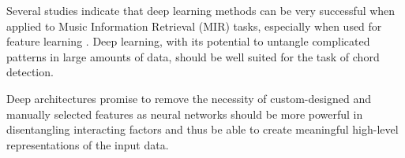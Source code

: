 \documentclass[landscape,archE1,fontscale=0.315]{baposter} %
\newcommand{\compresslist}{ %
\setlength{\itemsep}{1pt}
\setlength{\parskip}{0pt}
\setlength{\parsep}{0pt}
}
\begin{document}
\begin{poster}
{Several studies indicate that deep learning methods can be very successful
when applied to Music Information Retrieval (MIR)
tasks, especially when used for feature learning \cite{hamel2010learning}.
Deep learning, with its potential to untangle complicated
patterns in large amounts of data, should be well suited for
the task of chord detection.

Deep architectures
promise to remove the necessity of custom-designed
and manually selected features as neural networks should
be more powerful in disentangling interacting factors and
thus be able to create meaningful high-level representations
of the input data.

\vspace{0.3em} %
}


\end{poster}
\end{document}
